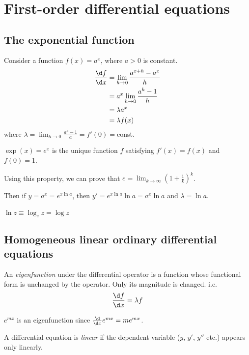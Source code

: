 \documentclass[a4paper]{article}
\begin{document}
\section{First-order differential equations}
\subsection{The exponential function}
Consider a function $f(x) = a^x$, where $a>0$ is constant. 
\begin{align*}
  \frac{\d f}{\d x} &= \lim_{h\to 0}\frac{a^{x+h}-a^x}{h}\\
  &= a^x\lim_{h\to 0}\frac{a^h-1}{h}\\
  &= \lambda a^x\\
  &= \lambda f(x)
\end{align*}
where $\displaystyle \lambda = \lim_{h\to 0}\frac{a^h-1}{a} = f'(0) = $const.

\begin{defi}
  $\exp(x) = e^x$ is the unique function $f$ satisfying $f'(x) = f(x)$ and $f(0) = 1$.
\end{defi}

Using this property, we can prove that $\displaystyle e=\lim_{k\to \infty} \left(1 + \frac{1}{k}\right)^k$. 

Then if $y = a^x = e^{x\ln a}$, then $y' = e^{x\ln a}\ln a = a^x\ln a$ and $\lambda = \ln a$. 

\begin{notation}
  $\ln z \equiv \log_e z = \log z$
\end{notation}

\subsection{Homogeneous linear ordinary differential equations}
\begin{defi}[Eigenfunction]
  An \emph{eigenfunction} under the differential operator is a function whose functional form is unchanged by the operator. Only its magnitude is changed. i.e.
  \[
  \frac{\d f}{\d x} = \lambda f
  \]
\end{defi}
\begin{eg}
$e^{mx}$ is an eigenfunction since $\frac{\d }{\d x}e^{mx} = me^{mx}$.
\end{eg}

\begin{defi}
  A differential equation is \emph{linear} if the dependent variable ($y$, $y'$, $y''$ etc.) appears only linearly.
\end{defi}
\end{document}

